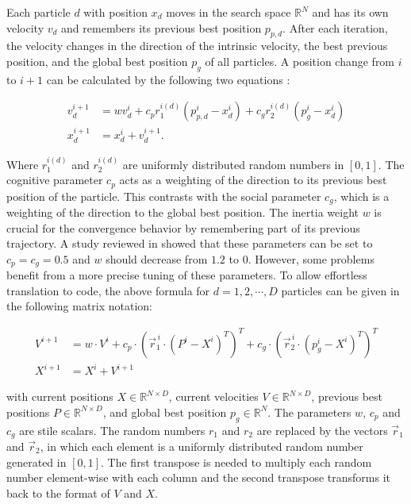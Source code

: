 \documentclass[
  oneside, a4paper, 12pt, openany]{book}
\theoremstyle{definition}
\theoremstyle{definition}
\theoremstyle{definition}
\theoremstyle{definition}
\theoremstyle{remark}
\begin{document}
Each particle \(d\) with position \(x_d\) moves in the search space \(\mathbb{R}^N\) and has its own velocity \(v_d\) and remembers its previous best position \(p_{p,d}\). After each iteration, the velocity changes in the direction of the intrinsic velocity, the best previous position, and the global best position \(p_g\) of all particles. A position change from \(i\) to \(i+1\) can be calculated by the following two equations \citep{PaVr2002}:

\[
\begin{aligned}
  v_d^{i+1} &= wv_d^{i} + c_p r_1^{i(d)} (p_{p,d}^i - x_d^i) + c_g r_2^{i(d)} (p_g^i - x_d^i) \\
  x_d^{i+1} &= x_d^i + v_d^{i+1}.
\end{aligned}
\]

Where \(r_1^{i(d)}\) and \(r_2^{i(d)}\) are uniformly distributed random numbers in \([0, 1]\). The cognitive parameter \(c_p\) acts as a weighting of the direction to its previous best position of the particle. This contrasts with the social parameter \(c_g\), which is a weighting of the direction to the global best position. The inertia weight \(w\) is crucial for the convergence behavior by remembering part of its previous trajectory. A study reviewed in \citep{PaVr2002} showed that these parameters can be set to \(c_p=c_g=0.5\) and \(w\) should decrease from \(1.2\) to \(0\). However, some problems benefit from a more precise tuning of these parameters. To allow effortless translation to code, the above formula for \(d = 1, 2, \cdots, D\) particles can be given in the following matrix notation:

\[
\begin{aligned}
  V^{i+1} &= w \cdot V^{i} + c_p \cdot (\vec{r}_1^{\,i} \cdot (P^i-X^i)^T)^T + c_g \cdot (\vec{r}_2^{\,i} \cdot (p_g^i - X^i)^T)^T \\
  X^{i+1} &= X^i + V^{i+1}
\end{aligned}
\]

with current positions \(X \in \mathbb{R}^{N \times D}\), current velocities \(V \in \mathbb{R}^{N \times D}\), previous best positions \(P \in \mathbb{R}^{N \times D}\), and global best position \(p_g \in \mathbb{R}^{N}\). The parameters \(w\), \(c_p\) and \(c_g\) are stile scalars. The random numbers \(r_1\) and \(r_2\) are replaced by the vectors \(\vec{r}_1\) and \(\vec{r}_2\), in which each element is a uniformly distributed random number generated in \([0, 1]\). The first transpose is needed to multiply each random number element-wise with each column and the second transpose transforms it back to the format of \(V\) and \(X\).
\end{document}

